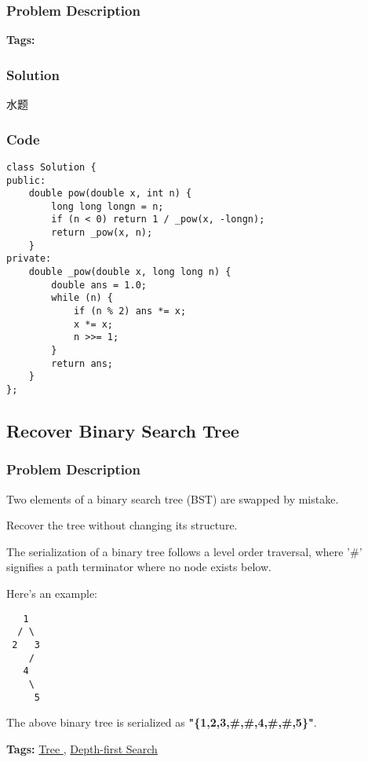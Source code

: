 \documentclass{article}
\begin{document}
\begin{CJK*}{UTF8}{gkai}
\subsubsection*{Problem Description}

\textbf{Tags: }



\subsubsection*{Solution}
水题

\subsubsection*{Code}
\begin{lstlisting}
class Solution {
public:
    double pow(double x, int n) {
        long long longn = n;
        if (n < 0) return 1 / _pow(x, -longn);
        return _pow(x, n);
    }
private:
    double _pow(double x, long long n) {
        double ans = 1.0;
        while (n) {
            if (n % 2) ans *= x;
            x *= x;
            n >>= 1;
        }
        return ans;
    }
}; 
\end{lstlisting}


\subsection{ Recover Binary Search Tree }
\label{ Recover Binary Search Tree }

\subsubsection*{Problem Description}
Two elements of a binary search tree (BST) are swapped by mistake.

Recover the tree without changing its structure.

The serialization of a binary tree follows a level order traversal, where '\#' signifies a path terminator where no node exists below.

Here's an example:


\begin{verbatim}
   1
  / \
 2   3
    /
   4
    \
     5
\end{verbatim}
The above binary tree is serialized as \textbf{"\{1,2,3,\#,\#,4,\#,\#,5\}"}.


\textbf{Tags: }
\hyperref[ Tree ]{ Tree },  \hyperref[ Depth-first Search ]{ Depth-first Search }



\end{CJK*}
\end{document}
